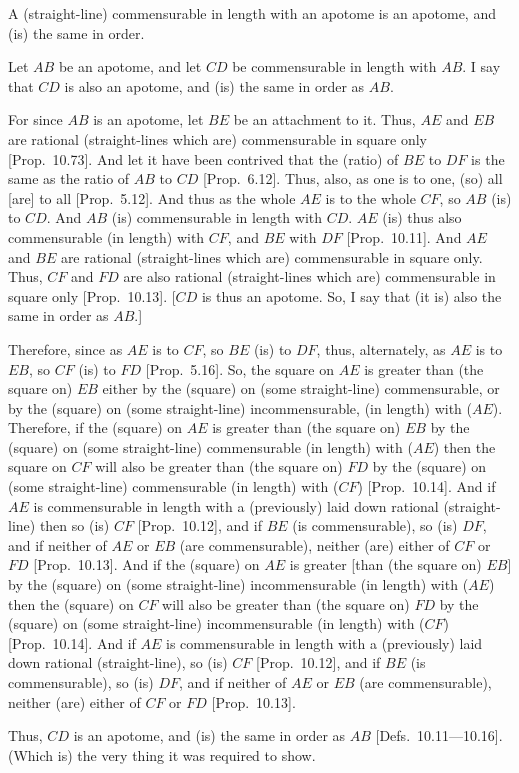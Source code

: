 \begin{Parallel}{}{}
{A (straight-line) commensurable in length
with an apotome is an apotome, and  (is) the same in order.

\epsfysize=0.7in
\centerline{}

Let $AB$ be an apotome, and let $CD$ be commensurable in length with $AB$. I say that $CD$ is also an apotome, and (is) the same in order as $AB$.

For since $AB$ is an apotome, let $BE$ be an attachment to it. Thus,
$AE$ and $EB$ are rational (straight-lines which are) commensurable in
square only [Prop.~10.73]. And let it have
been contrived that the (ratio)
of $BE$ to $DF$ is the same as the ratio of $AB$ to $CD$
[Prop.~6.12]. Thus, also, as one is to one, (so)
all [are] to all [Prop.~5.12]. And thus as the whole $AE$ is to the whole $CF$, so $AB$
(is) to $CD$. And $AB$ (is) commensurable in length with $CD$.
$AE$ (is) thus also commensurable (in length) with $CF$, and $BE$
with $DF$ [Prop.~10.11]. And $AE$ and $BE$
are rational (straight-lines which are) commensurable in square only.
Thus, $CF$ and $FD$ are also rational (straight-lines which are) commensurable in square only [Prop.~10.13].
[$CD$ is thus an apotome. So, I say that (it is) also the same in order as $AB$.]

Therefore, since as $AE$ is to $CF$, so $BE$ (is) to $DF$, thus, alternately,
as $AE$ is to $EB$, so $CF$ (is) to $FD$ [Prop.~5.16]. So,  the square on $AE$
is greater than (the square on) $EB$ either by the (square) on (some straight-line)
commensurable,  or by the (square) on (some straight-line)
incommensurable, (in length) with ($AE$). Therefore, if the
(square) on $AE$ is greater than (the square on) $EB$ by the (square)
on (some straight-line) commensurable (in length) with ($AE$) then the
square on $CF$ will also be greater than (the square on) $FD$ by the (square)
on (some straight-line) commensurable (in length) with ($CF$)
[Prop.~10.14]. And if $AE$ is commensurable
in length with a (previously) laid down rational (straight-line) then so (is)
$CF$ [Prop.~10.12], and if $BE$ (is commensurable), so (is) $DF$, and if neither of
$AE$ or $EB$ (are commensurable), neither  (are) either of $CF$ or $FD$
[Prop.~10.13]. And if the (square) on
$AE$ is greater [than (the square on) $EB$] by the (square) on
(some straight-line) incommensurable (in length) with ($AE$) then the
(square) on $CF$ will also be greater than (the square on) $FD$ by the (square)
on (some straight-line) incommensurable (in length) with ($CF$)
[Prop.~10.14].  And if $AE$ is commensurable
in length with a (previously) laid down rational (straight-line), so (is)
$CF$ [Prop.~10.12], and if $BE$ (is commensurable), so (is) $DF$, and if neither of
$AE$ or $EB$ (are commensurable),  neither (are)  either of $CF$ or $FD$
[Prop.~10.13].

Thus, $CD$ is an apotome, and (is) the same in order as $AB$ [Defs.~10.11---10.16].
(Which is) the very thing it was required to show.}
\end{Parallel}

